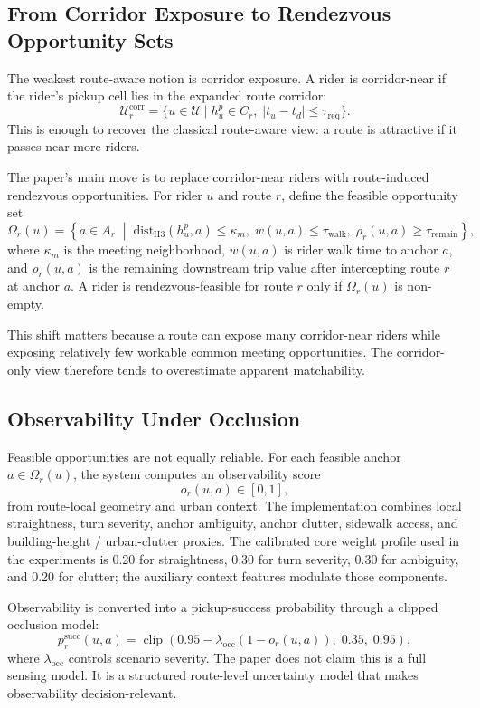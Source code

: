 \documentclass[journal]{IEEEtran}
\begin{document}
\subsection{From Corridor Exposure to Rendezvous Opportunity Sets}
The weakest route-aware notion is corridor exposure. A rider is corridor-near if the rider's pickup cell lies in the expanded route corridor:
\[
\mathcal{U}_r^{\mathrm{corr}} = \{u \in \mathcal{U} \mid h_u^p \in C_r,\; |t_u - t_d| \le \tau_{\mathrm{req}}\}.
\]
This is enough to recover the classical route-aware view: a route is attractive if it passes near more riders.

The paper's main move is to replace corridor-near riders with route-induced rendezvous opportunities. For rider $u$ and route $r$, define the feasible opportunity set
\[
\Omega_r(u) = \left\{ a \in A_r \;\middle|\; \mathrm{dist}_{\mathrm{H3}}(h_u^p,a) \le \kappa_m,\; w(u,a) \le \tau_{\mathrm{walk}},\; \rho_r(u,a) \ge \tau_{\mathrm{remain}} \right\},
\]
where $\kappa_m$ is the meeting neighborhood, $w(u,a)$ is rider walk time to anchor $a$, and $\rho_r(u,a)$ is the remaining downstream trip value after intercepting route $r$ at anchor $a$. A rider is rendezvous-feasible for route $r$ only if $\Omega_r(u)$ is non-empty.

This shift matters because a route can expose many corridor-near riders while exposing relatively few workable common meeting opportunities. The corridor-only view therefore tends to overestimate apparent matchability.

\subsection{Observability Under Occlusion}
Feasible opportunities are not equally reliable. For each feasible anchor $a \in \Omega_r(u)$, the system computes an observability score
\[
o_r(u,a) \in [0,1],
\]
from route-local geometry and urban context. The implementation combines local straightness, turn severity, anchor ambiguity, anchor clutter, sidewalk access, and building-height / urban-clutter proxies. The calibrated core weight profile used in the experiments is 0.20 for straightness, 0.30 for turn severity, 0.30 for ambiguity, and 0.20 for clutter; the auxiliary context features modulate those components.

Observability is converted into a pickup-success probability through a clipped occlusion model:
\[
p_r^{\mathrm{succ}}(u,a) = \operatorname{clip}\left(0.95 - \lambda_{\mathrm{occ}}(1-o_r(u,a)),\; 0.35,\; 0.95\right),
\]
where $\lambda_{\mathrm{occ}}$ controls scenario severity. The paper does not claim this is a full sensing model. It is a structured route-level uncertainty model that makes observability decision-relevant.
\end{document}
